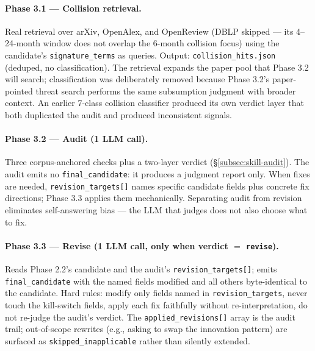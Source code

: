 \documentclass[10pt,a4paper]{article}
\begin{document}
\paragraph{Phase 3.1 --- Collision retrieval.} Real retrieval over arXiv, OpenAlex, and OpenReview (DBLP skipped --- its 4--24-month window does not overlap the 6-month collision focus) using the candidate's \texttt{signature\_terms} as queries. Output: \texttt{collision\_hits.json} (deduped, no classification). The retrieval expands the paper pool that Phase 3.2 will search; classification was deliberately removed because Phase 3.2's paper-pointed threat search performs the same subsumption judgment with broader context. An earlier 7-class collision classifier produced its own verdict layer that both duplicated the audit and produced inconsistent signals.

\paragraph{Phase 3.2 --- Audit (1 LLM call).} Three corpus-anchored checks plus a two-layer verdict (\S\ref{subsec:skill-audit}). The audit emits no \texttt{final\_candidate}: it produces a judgment report only. When fixes are needed, \texttt{revision\_targets[]} names specific candidate fields plus concrete fix directions; Phase 3.3 applies them mechanically. Separating audit from revision eliminates self-answering bias --- the LLM that judges does not also choose what to fix.

\paragraph{Phase 3.3 --- Revise (1 LLM call, only when verdict $=$ \texttt{revise}).} Reads Phase 2.2's candidate and the audit's \texttt{revision\_targets[]}; emits \texttt{final\_candidate} with the named fields modified and all others byte-identical to the candidate. Hard rules: modify only fields named in \texttt{revision\_targets}, never touch the kill-switch fields, apply each fix faithfully without re-interpretation, do not re-judge the audit's verdict. The \texttt{applied\_revisions[]} array is the audit trail; out-of-scope rewrites (e.g., asking to swap the innovation pattern) are surfaced as \texttt{skipped\_inapplicable} rather than silently extended.
\end{document}
